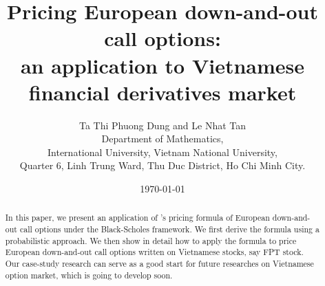 \documentclass[12pt]{article}
\begin{document}
\newpage

\title{Pricing European down-and-out call options: \\
an application to Vietnamese financial derivatives market}
\author{ Ta Thi Phuong Dung 
	and Le Nhat Tan
	\\Department of Mathematics,\\
	 International University,
	 Vietnam National University, \\
	 Quarter 6, Linh Trung Ward, Thu Duc District, Ho Chi Minh City. }

%		
%		
%		
	\date{\today}
	\maketitle
\begin{abstract}
 In this paper, we present an application of \citet{Merton73}'s pricing formula of European down-and-out call options under the Black-Scholes framework. We first derive the formula using a probabilistic approach. We then show in detail how to apply the formula to price European down-and-out call options written on Vietnamese stocks, say FPT stock. Our case-study research can serve as a good start for future researches on Vietnamese option market, which is going to develop soon.
\end{abstract}
\end{document}
